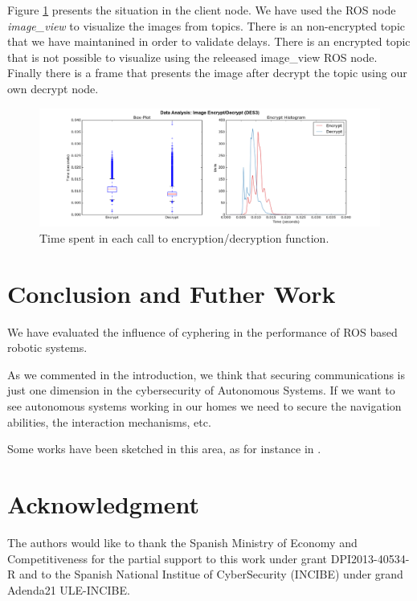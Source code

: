 \documentclass[journal,twoside]{JoPhA}
\begin{document}
Figure \ref{fig:images_encryption} presents the situation in the client node. We have used the ROS node {\em image\_view} to visualize the images from topics.  There is an non-encrypted topic that we have maintanined in order to validate delays. There is an encrypted topic that is not possible to visualize using the releeased image\_view ROS node. Finally there is a frame that presents the image after decrypt the topic using our own decrypt node. 

\begin{figure}[ht!]
    \centering
    \includegraphics[width=.9\textwidth]{Outline_images_encryption_decrytiontime2.png}
    \caption{Time spent in each call to encryption/decryption function.}
  \label{fig:images_encryption}
\end{figure}



% 
% 
% 
% 
% 





\section{Conclusion and Futher Work}

We have evaluated the influence of cyphering in the performance of ROS based robotic systems.

As we commented in the introduction, we think that securing communications is just one dimension in  the cybersecurity of Autonomous Systems. If we want to see autonomous systems working in our homes we need to secure the navigation abilities, the interaction mechanisms, etc. 
 
Some works have been sketched in this area, as for instance in \cite{Guiochet2016}.




\section*{Acknowledgment}
The authors would  like to thank the Spanish Ministry of Economy and Competitiveness for the partial support to this work under grant DPI2013-40534-R and to the Spanish National Institue of CyberSecurity (INCIBE) under grand Adenda21 ULE-INCIBE.

 

\end{document}
